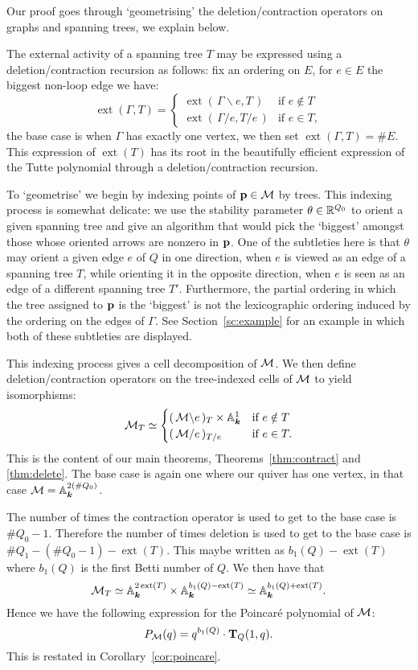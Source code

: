 \documentclass{amsart}
\theoremstyle{definition}
\DeclareMathOperator{\extact}{ext}
\begin{document}
Our proof goes through `geometrising' the deletion/contraction operators on graphs and spanning trees, we explain below.

The external activity of a spanning tree $T$ may be expressed using a deletion/contraction recursion as follows: fix an ordering on $E$, for $e \in E$ the biggest non-loop edge we have:
$$\extact(\Gamma,T) = \begin{cases} \extact(\,{\Gamma\backslash e, T}\,) & \text{if } e \notin T \\ \extact(\,{\Gamma/e, T/e}\,) & \text{if } e \in T,\end{cases}
$$
the base case is when $\Gamma$ has exactly one vertex, we then set $\extact({\Gamma,T})=\#E.$
This expression of $\extact(T)$ has its root in the beautifully efficient expression of the Tutte polynomial through a deletion/contraction recursion.

To `geometrise' we begin by indexing points of $\mathbf{p} \in \mathcal{M}$ by trees.
This indexing process is somewhat delicate: we use the stability parameter $\theta \in \mathbb{R}^{Q_0}$ to orient a given spanning tree and give an algorithm that would pick the `biggest' amongst those whose oriented arrows are nonzero in $\mathbf{p}$.
One of the subtleties here is that $\theta$ may orient a given edge $e$ of $Q$ in one direction, when $e$ is viewed as an edge of a spanning tree $T$, while orienting it in the opposite direction, when $e$ is seen as an edge of a different spanning tree $T'$.
Furthermore, the partial ordering in which the tree assigned to $\mathbf{p}$ is the `biggest' is not the lexicographic ordering induced by the ordering on the edges of $\Gamma$.
See Section~\ref{sc:example} for an example in which both of these subtleties are displayed.

This indexing process gives a cell decomposition of $\mathcal{M}$.
We then define deletion/contraction operators on the tree-indexed cells of $\mathcal{M}$ to yield isomorphisms:
$$\mathcal{M}_T \simeq \begin{cases} (\,\mathcal{M}\backslash e\,)_T \times \mathbb{A}_{\boldsymbol{k}}^1 & \text{if } e \notin T \\ (\,\mathcal{M}/ e\,)_{T/e} & \text{if } e \in T.\end{cases}
$$
This is the content of our main theorems, Theorems~\ref{thm:contract} and \ref{thm:delete}. 
The base case is again one where our quiver has one vertex, in that case $\mathcal{M} = \mathbb{A}_{\boldsymbol{k}}^{2(\#Q_0)}$.

The number of times the contraction operator is used to get to the base case is $\#Q_0-1$. 
Therefore the number of times deletion is used to get to the base case is $\#Q_1-(\#Q_0-1) - \extact(T)$. This maybe written as $b_1(Q)-\extact(T)$ where $b_1(Q)$ is the first Betti number of $Q$.
We then have that $$\cM_T \simeq \bA_\bk^{2 \extact(T)} \times \bA_\bk^{b_1(Q)- \extact(T)} \simeq \bA_\bk^{b_1(Q)+\extact(T)}.$$
Hence we have the following expression for the Poincar\'e polynomial of $\mathcal{M}$:
$$P_{\mathcal{M}}(q) = q^{b_1(Q)} \cdot \mathbf{T}_Q(1,q).$$
This is restated in Corollary~\ref{cor:poincare}.
\end{document}
